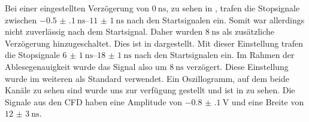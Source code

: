 Bei einer eingestellten Verzögerung von $\SI{0}{\nano\second}$, zu sehen in , trafen die Stopsignale zwischen $\SIrange{-0.5(1)}{11(1)}{\nano\second}$ nach den Startsignalen ein. Somit war allerdings nicht zuverlässig nach dem Startsignal. Daher wurden $\SI{8}{\nano\second}$ als zusätzliche Verzögerung hinzugeschaltet. Dies ist in  dargestellt. Mit dieser Einstellung trafen die Stopsignale $\SIrange{6(1)}{18(1)}{\nano\second}$ nach den Startsignalen ein. Im Rahmen der Ablesegenauigkeit wurde das Signal also um $\SI{8}{\nano\second}$ verzögert. Diese Einstellung wurde im weiteren als Standard verwendet. Ein Oszillogramm, auf dem beide Kanäle zu sehen sind wurde uns zur verfügung gestellt\cite{oszidata} und ist in  zu sehen.
Die Signale aus den CFD haben eine Amplitude von $\SI{-0.8(1)}{\volt}$ und eine Breite von $\SI{12(3)}{\nano\second}$.





